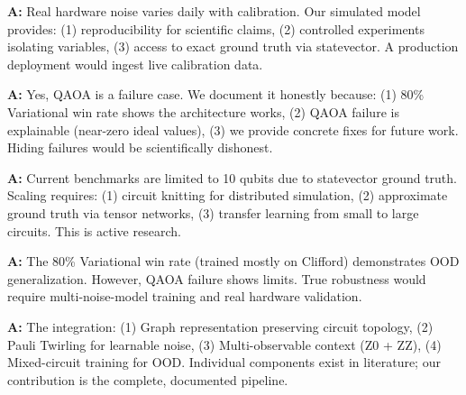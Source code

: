 \documentclass[11pt, a4paper]{article}
\begin{document}
\begin{tcolorbox}[colback=gray!5!white, colframe=gray!75!black, title=Q1: Why not use real IBM hardware noise?]
\textbf{A:} Real hardware noise varies daily with calibration. Our simulated model provides: (1) reproducibility for scientific claims, (2) controlled experiments isolating variables, (3) access to exact ground truth via statevector. A production deployment would ingest live calibration data.
\end{tcolorbox}

\begin{tcolorbox}[colback=gray!5!white, colframe=gray!75!black, title=Q2: Your QAOA results are poor. Isn't that a failure?]
\textbf{A:} Yes, QAOA is a failure case. We document it honestly because: (1) 80\% Variational win rate shows the architecture works, (2) QAOA failure is explainable (near-zero ideal values), (3) we provide concrete fixes for future work. Hiding failures would be scientifically dishonest.
\end{tcolorbox}

\begin{tcolorbox}[colback=gray!5!white, colframe=gray!75!black, title=Q3: How does this scale to 100+ qubits?]
\textbf{A:} Current benchmarks are limited to 10 qubits due to statevector ground truth. Scaling requires: (1) circuit knitting for distributed simulation, (2) approximate ground truth via tensor networks, (3) transfer learning from small to large circuits. This is active research.
\end{tcolorbox}

\begin{tcolorbox}[colback=gray!5!white, colframe=gray!75!black, title=Q4: Is this just overfitting to your noise model?]
\textbf{A:} The 80\% Variational win rate (trained mostly on Clifford) demonstrates OOD generalization. However, QAOA failure shows limits. True robustness would require multi-noise-model training and real hardware validation.
\end{tcolorbox}

\begin{tcolorbox}[colback=gray!5!white, colframe=gray!75!black, title=Q5: What's novel about your approach?]
\textbf{A:} The integration: (1) Graph representation preserving circuit topology, (2) Pauli Twirling for learnable noise, (3) Multi-observable context (Z0 + ZZ), (4) Mixed-circuit training for OOD. Individual components exist in literature; our contribution is the complete, documented pipeline.
\end{tcolorbox}
\end{document}

